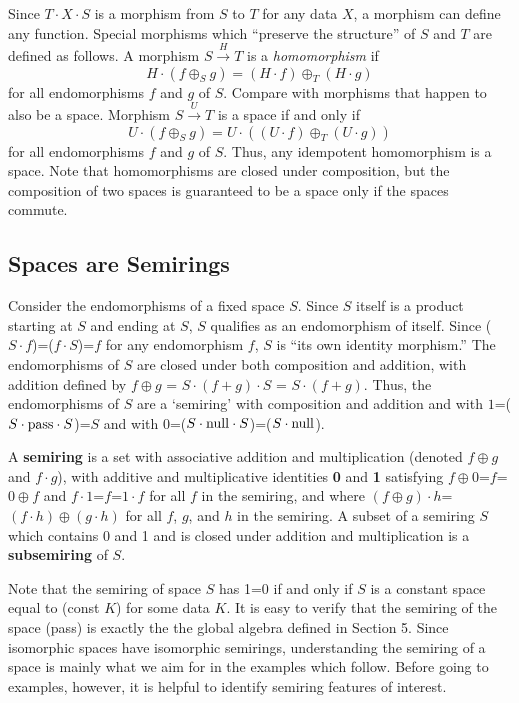 \documentclass[11pt]{article}
\begin{document}
    Since $T\cdot X\cdot S$ is a morphism from $S$ to $T$ for any data $X$, a morphism can define any function.  Special morphisms which 
``preserve the structure'' of $S$ and $T$ are defined as follows.  A morphism $S{\overset H\longrightarrow}T$ is a {\it homomorphism} if 
\begin{equation}
H\cdot (f\oplus_S g) = (H\cdot f) \oplus_T (H\cdot g) 
\end{equation}
for all endomorphisms $f$ and $g$ of $S$.  Compare with morphisms that happen to also be a space.  Morphism $S{\overset U\longrightarrow}T$ is a space if and only if 
\begin{equation}
U\cdot (f\oplus_S g) = U\cdot ((U\cdot f) \oplus_T (U\cdot g)) 
\end{equation}
for all endomorphisms $f$ and $g$ of $S$.  Thus, any idempotent homomorphism is a space.  
Note that homomorphisms are closed under composition, but the composition of two spaces is guaranteed to be a space 
only if the spaces commute.  

\subsection{Spaces are Semirings} 

     Consider the endomorphisms of a fixed space $S$.  Since $S$ itself is a product starting at $S$ and ending at $S$, $S$ qualifies as an endomorphism of itself.  	
 Since ($S\cdot f$)=($f\cdot S$)=$f$ for any endomorphism $f$, $S$ is ``its own identity morphism.''  The endomorphisms 
of $S$ are closed under both composition and addition, with addition defined by $f\oplus g$ = $S\cdot(f+g)\cdot S$ = $S\cdot(f+g)$.  
Thus, the endomorphisms of $S$ are a `semiring' with composition and addition and with $1$=($S\cdot {\rm pass}\cdot S$)=$S$ and with 
$0$=($S\cdot {\rm null}\cdot S$)=($S\cdot {\rm null}$).  

\begin{definition}
A {\bf semiring} is a set with associative addition and multiplication (denoted $f\oplus g$ and $f\cdot g$), with additive and 
multiplicative identities {\bf 0} and {\bf 1} satisfying $f\oplus 0$=$f$=$0\oplus f$ and $f\cdot 1$=$f$=$1\cdot f$ for all $f$ in the semiring, and where 
$(f\oplus g)\cdot h$=$(f\cdot h)\oplus (g\cdot h)$ for all $f$, $g$, and $h$ in the semiring.  
A subset of a semiring $S$ which contains 0 and 1 and is closed under addition and multiplication is a {\bf subsemiring} of $S$.   
\end{definition} 
\noindent 
Note that the semiring of space $S$ has 1=0 if and only if $S$ is a constant space equal to (const $K$) for some data $K$.  
It is easy to verify that the semiring of the space (pass) is exactly the the global algebra defined in Section 5.  Since isomorphic spaces have 
isomorphic semirings, understanding the semiring of a space is mainly what we aim for in the examples which follow.  Before going to examples, however, it is helpful 
to identify semiring features of interest. 
\end{document}
